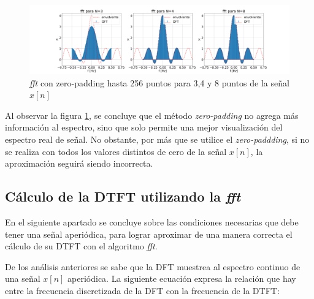 \documentclass[11pt,a4paper]{article}
\begin{document}
    \begin{figure}[H]
    \centering
    \includegraphics[width=\textwidth]{Img/punto_3_c.png}
    \caption{\textit{fft} con zero-padding hasta 256 puntos para 3,4 y 8 puntos de la señal $x[n]$}
    \label{fig.1c}
    \end{figure}
    
    Al observar la figura \ref{fig.1c}, se concluye que el método \textit{zero-padding} no agrega más información al espectro, sino que solo permite una mejor visualización del espectro real de señal. No obstante, por más que se utilice el \textit{zero-paddding}, si no se realiza con todos los valores distintos de cero de la señal $x[n]$, la aproximación seguirá siendo incorrecta.
    


    \subsection{Cálculo de la DTFT utilizando la \textit{fft}}
        En el siguiente apartado se concluye sobre las condiciones necesarias que debe tener una señal aperiódica, para lograr aproximar de una manera correcta el cálculo de su DTFT con el algoritmo \textit{fft}. 
        
        
        De los análisis anteriores se sabe que la DFT muestrea al espectro continuo de una señal $x[n]$ aperiódica. La siguiente ecuación expresa la relación que hay entre la frecuencia discretizada de la DFT con la frecuencia de la DTFT: 
        
\end{document}
